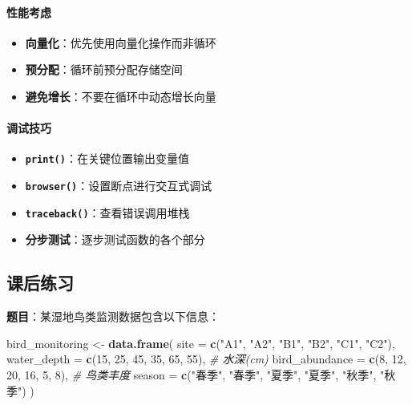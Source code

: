 \documentclass[
]{book}
\newenvironment{Shaded}{\begin{snugshade}}{\end{snugshade}}
\newcommand{\AttributeTok}[1]{\textcolor[rgb]{0.13,0.29,0.53}{#1}}
\newcommand{\CommentTok}[1]{\textcolor[rgb]{0.56,0.35,0.01}{\textit{#1}}}
\newcommand{\DecValTok}[1]{\textcolor[rgb]{0.00,0.00,0.81}{#1}}
\newcommand{\FunctionTok}[1]{\textcolor[rgb]{0.13,0.29,0.53}{\textbf{#1}}}
\newcommand{\NormalTok}[1]{#1}
\newcommand{\OtherTok}[1]{\textcolor[rgb]{0.56,0.35,0.01}{#1}}
\newcommand{\StringTok}[1]{\textcolor[rgb]{0.31,0.60,0.02}{#1}}
\providecommand{\tightlist}{%
  \setlength{\itemsep}{0pt}\setlength{\parskip}{0pt}}
\begin{document}
\hypertarget{ux6027ux80fdux8003ux8651}{%
\paragraph{性能考虑}\label{ux6027ux80fdux8003ux8651}}

\begin{itemize}
\tightlist
\item
  \textbf{向量化}：优先使用向量化操作而非循环
\item
  \textbf{预分配}：循环前预分配存储空间
\item
  \textbf{避免增长}：不要在循环中动态增长向量
\end{itemize}

\hypertarget{ux8c03ux8bd5ux6280ux5de7}{%
\paragraph{调试技巧}\label{ux8c03ux8bd5ux6280ux5de7}}

\begin{itemize}
\tightlist
\item
  \textbf{\texttt{print()}}：在关键位置输出变量值
\item
  \textbf{\texttt{browser()}}：设置断点进行交互式调试
\item
  \textbf{\texttt{traceback()}}：查看错误调用堆栈
\item
  \textbf{分步测试}：逐步测试函数的各个部分
\end{itemize}

\hypertarget{ux8bfeux540eux7ec3ux4e60-7}{%
\subsection{课后练习}\label{ux8bfeux540eux7ec3ux4e60-7}}

\textbf{题目}：某湿地鸟类监测数据包含以下信息：

\begin{Shaded}
\begin{Highlighting}[]
\NormalTok{bird\_monitoring }\OtherTok{\textless{}{-}} \FunctionTok{data.frame}\NormalTok{(}
  \AttributeTok{site =} \FunctionTok{c}\NormalTok{(}\StringTok{"A1"}\NormalTok{, }\StringTok{"A2"}\NormalTok{, }\StringTok{"B1"}\NormalTok{, }\StringTok{"B2"}\NormalTok{, }\StringTok{"C1"}\NormalTok{, }\StringTok{"C2"}\NormalTok{),}
  \AttributeTok{water\_depth =} \FunctionTok{c}\NormalTok{(}\DecValTok{15}\NormalTok{, }\DecValTok{25}\NormalTok{, }\DecValTok{45}\NormalTok{, }\DecValTok{35}\NormalTok{, }\DecValTok{65}\NormalTok{, }\DecValTok{55}\NormalTok{),  }\CommentTok{\# 水深(cm)}
  \AttributeTok{bird\_abundance =} \FunctionTok{c}\NormalTok{(}\DecValTok{8}\NormalTok{, }\DecValTok{12}\NormalTok{, }\DecValTok{20}\NormalTok{, }\DecValTok{16}\NormalTok{, }\DecValTok{5}\NormalTok{, }\DecValTok{8}\NormalTok{),   }\CommentTok{\# 鸟类丰度}
  \AttributeTok{season =} \FunctionTok{c}\NormalTok{(}\StringTok{"春季"}\NormalTok{, }\StringTok{"春季"}\NormalTok{, }\StringTok{"夏季"}\NormalTok{, }\StringTok{"夏季"}\NormalTok{, }\StringTok{"秋季"}\NormalTok{, }\StringTok{"秋季"}\NormalTok{)}
\NormalTok{)}
\end{Highlighting}
\end{Shaded}
\end{document}
